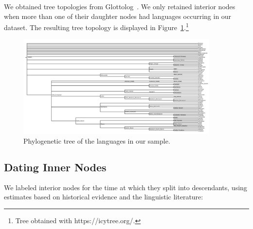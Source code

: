 \documentclass[11pt,a4paper]{article}
\begin{document}
We obtained tree topologies from Glottolog~\citep{nordhoff2011glottolog}.
We only retained interior nodes when more than one of their daughter nodes had languages occurring in our dataset.
The resulting tree topology is displayed in Figure~\ref{fig:tree}.\footnote{Tree obtained with https://icytree.org/.}


\begin{figure}
    \centering
	\includegraphics[width=0.9\textwidth]{../trees/tree.png}
       \caption{Phylogenetic tree of the languages in our sample.}
    \label{fig:tree}
\end{figure}




\subsection{Dating Inner Nodes}
We labeled interior nodes for the time at which they split into descendants, using estimates based on historical evidence and the linguistic literature:


\end{document}
